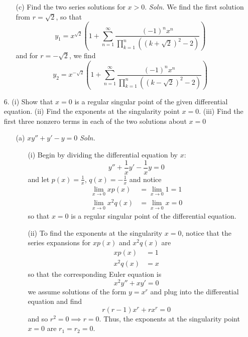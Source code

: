 \documentclass{article}
\begin{document}
\begin{itemize}
\begin{itemize}
        \item[(c)] Find the two series solutions for $x > 0$.
        \newline\newline
        \textit{Soln.} We find the first solution from $r = \sqrt{2}$, so that
        \[y_1 = x^{\sqrt{2}} \left(1 + \sum_{n = 1}^{\infty}\frac{(-1)^nx^n}{\prod_{k = 1}^n ((k + \sqrt{2})^2 - 2)}\right)\]
        and for $r = -\sqrt{2}$, we find
        \[y_2 = x^{-\sqrt{2}} \left(1 + \sum_{n = 1}^{\infty} \frac{(-1)^nx^n}{\prod_{k = 1}^n ((k - \sqrt{2})^2 - 2)}\right)\]
    \end{itemize}

    \pagebreak
    \item[6.] (i) Show that $x = 0$ is a regular singular point of the given differential equation.
    \newline
    (ii) Find the exponents at the singularity point $x = 0$.
    \newline
    (iii) Find the first three nonzero terms in each of the two solutions about $x = 0$
    \begin{itemize}
        \item[(a)] $xy'' + y' - y = 0$
        \newline\newline
        \textit{Soln.}
        \begin{itemize}
            \item[(i)] Begin by dividing the differential equation by $x$:
            \[y'' + \frac{1}{x}y' - \frac{1}{x}y = 0\]
            and let $p(x) = \frac{1}{x}$, $q(x) = -\frac{1}{x}$ and notice
            \begin{align*}
                \lim_{x \to 0} xp(x) &= \lim_{x \to 0} 1 = 1\\
                \lim_{x \to 0} x^2q(x) &= \lim_{x \to 0} x = 0
            \end{align*}
            so that $x = 0$ is a regular singular point of the differential equation. 
            \newline\newline

            \item[(ii)] To find the exponents at the singularity $x = 0$, notice that the series expansions for $xp(x)$ and $x^2q(x)$ are 
            \begin{align*}
                xp(x) &= 1\\
                x^2q(x) &= x
            \end{align*}
            so that the corresponding Euler equation is 
            \[x^2y'' + xy' = 0\]
            we assume solutions of the form $y = x^r$ and plug into the differential equation and find
            \[r(r - 1)x^r + rx^r = 0\]
            and so $r^2 = 0 \implies r = 0$. Thus, the exponents at the singularity point $x = 0$ are $r_1 = r_2 = 0$.
            \newline\newline


\end{itemize}
\end{itemize}
\end{itemize}
\end{document}
